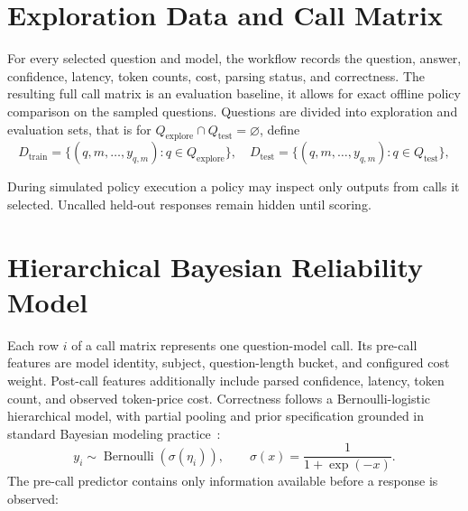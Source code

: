 \documentclass[11pt]{article}
\begin{document}
\section{Exploration Data and Call Matrix}

For every selected question and model, the workflow records the question, answer, confidence, latency, token counts, cost, parsing status, and correctness. 
The resulting full call matrix is an evaluation baseline, it allows for exact offline policy comparison on the sampled questions.
Questions are divided into exploration and evaluation sets, that is for $Q_{\mathrm{explore}}\cap Q_{\mathrm{test}}=\varnothing$, define
\begin{equation*}
D_{\mathrm{train}}
=
\{(q,m,\ldots,y_{q,m}):q\in Q_{\mathrm{explore}}\}, \quad
D_{\mathrm{test}}
=
\{(q,m,\ldots,y_{q,m}):q\in Q_{\mathrm{test}}\},
\end{equation*}

During simulated policy execution a policy may inspect only outputs from calls it selected. Uncalled held-out responses remain hidden until scoring.




\section{Hierarchical Bayesian Reliability Model}

Each row $i$ of a call matrix represents one question-model call. 
Its pre-call features are model identity, subject, question-length bucket, and configured cost weight. 
Post-call features additionally include parsed confidence, latency, token count, and observed token-price cost.
Correctness follows a Bernoulli-logistic hierarchical model, with partial pooling and prior specification grounded in standard Bayesian modeling practice~\citep{gelman2013bayesian}:
\begin{equation*}
y_i\sim\operatorname{Bernoulli}(\sigma(\eta_i)),
\qquad
\sigma(x)=\frac{1}{1+\exp(-x)}.
\end{equation*}
The pre-call predictor contains only information available before a response is observed:
\end{document}
